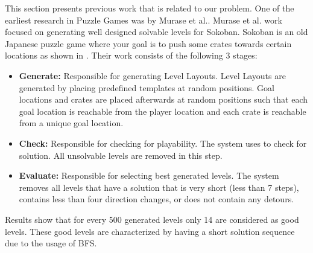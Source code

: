 This section presents previous work that is related to our problem. One of the earliest research in Puzzle Games was by Murase et al.\cite{sokobanLevelGenerationOld}. Murase et al. work focused on generating well designed solvable levels for Sokoban\cite{sokoban}. Sokoban is an old Japanese puzzle game where your goal is to push some crates towards certain locations as shown in . Their work consists of the following 3 stages:
\begin{itemize} \itemsep0pt \parskip0pt 
	\item \textbf{Generate:} Responsible for generating Level Layouts. Level Layouts are generated by placing predefined templates at random positions. Goal locations and crates are placed afterwards at random positions such that each goal location is reachable from the player location and each crate is reachable from a unique goal location.
	\item \textbf{Check:} Responsible for checking for playability. The system uses  to check for solution. All unsolvable levels are removed in this step.
	\item \textbf{Evaluate:} Responsible for selecting best generated levels. The system removes all levels that have a solution that is very short (less than 7 steps), contains less than four direction changes, or does not contain any detours.
\end{itemize}
Results show that for every 500 generated levels only 14 are considered as good levels. These good levels are characterized by having a short solution sequence due to the usage of BFS.\\\par

